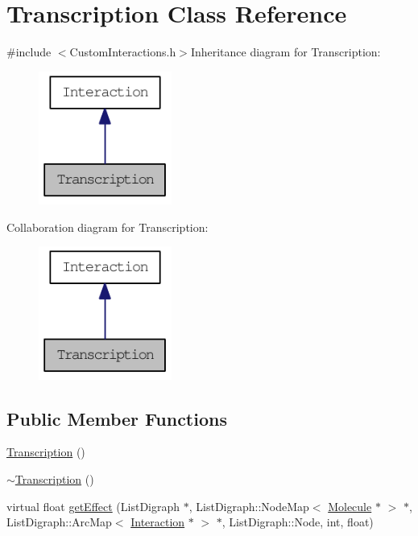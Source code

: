 \hypertarget{classTranscription}{
\section{Transcription Class Reference}
\label{classTranscription}
}


{\ttfamily \#include $<$CustomInteractions.h$>$}Inheritance diagram for Transcription:\nopagebreak
\begin{figure}[H]
\begin{center}
\leavevmode
\includegraphics[width=124pt]{classTranscription__inherit__graph}
\end{center}
\end{figure}
Collaboration diagram for Transcription:\nopagebreak
\begin{figure}[H]
\begin{center}
\leavevmode
\includegraphics[width=124pt]{classTranscription__coll__graph}
\end{center}
\end{figure}
\subsection*{Public Member Functions}
\begin{DoxyCompactItemize}
\item 
\hyperlink{classTranscription_a62de8bf657c60367b130dee116cb5dd5}{Transcription} ()
\item 
\hyperlink{classTranscription_a51326fb001bf9d6dc18debd770ef0321}{$\sim$Transcription} ()
\item 
virtual float \hyperlink{classTranscription_a73f9e09dac4b601a297fd4d59c92cea5}{getEffect} (ListDigraph $\ast$, ListDigraph::NodeMap$<$ \hyperlink{classMolecule}{Molecule} $\ast$ $>$ $\ast$, ListDigraph::ArcMap$<$ \hyperlink{classInteraction}{Interaction} $\ast$ $>$ $\ast$, ListDigraph::Node, int, float)
\end{DoxyCompactItemize}


